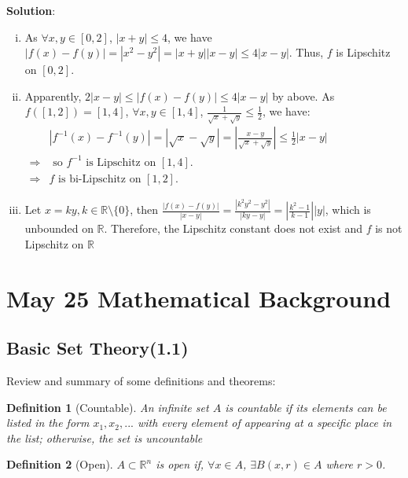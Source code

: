 \documentclass[12pt, a4paper]{article}
\newtheorem{definition}{Definition}[subsection]
\begin{document}
\textbf{Solution}: 
\begin{enumerate}[(i)]
    \item As $\forall x, y\in [0,2]$, $|x+y|\leq 4$, we have $|f(x)-f(y)|=\left|x^{2}-y^{2}\right|=|x+y||x-y| \leq 4|x-y|$.
    Thus, $f$ is Lipschitz on $[0,2]$.
    \item Apparently, $2|x-y|\leq|f(x) - f(y)|\leq 4|x-y|$ by above. As $f([1, 2]) = [1, 4]$, $\forall x, y \in [1, 4]$, $\displaystyle \frac{1}{\sqrt{x}+\sqrt{y}} \leq \frac{1}{2}$, we have: \\
    \(
    \begin{aligned}
        &\displaystyle \left|f^{-1}(x)-f^{-1}(y)\right|=|\sqrt{x}-\sqrt{y}|=\left|\frac{x-y}{\sqrt{x}+\sqrt{y}}\right| \leq \frac{1}{2}|x-y|\\
        \Rightarrow & \text{ so } f^{-1} \text{ is Lipschitz on } [1,4]. \\
        \Rightarrow & f \text{ is bi-Lipschitz on }[1,2].
    \end{aligned}
    \)
    \item Let $x = ky, k\in\mathbb{R}\setminus\{0\}$, then $\displaystyle \frac{|f(x) - f(y)|}{|x - y|} = \frac{|k^2y^2 - y^2|}{|ky - y|} = \left|\frac{k^2 - 1}{k-1} \right | |y|$, which is unbounded on $\mathbb{R}$. Therefore, the Lipschitz constant does not exist and $f$ is not Lipschitz on $\mathbb{R}$

\end{enumerate}


\newpage
\section{May 25 Mathematical Background}
\subsection{Basic Set Theory(1.1)}

Review and summary of some definitions and theorems:

\begin{definition}[Countable]
    An infinite set $A$ is countable if its elements 
    can be listed in the form $x_1, x_2, ...$ with every 
    element of appearing at a specific place in the list; 
    otherwise, the set is uncountable
\end{definition}

\begin{definition}[Open]
    $A \subset \mathbb{R}^n$ is open if, $\forall x\in A$, $\exists B(x, r)\in A$ where $r>0$.
\end{definition}
\end{document}

